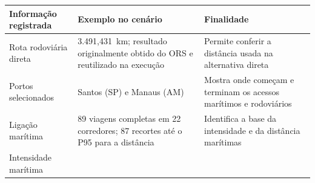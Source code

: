 \documentclass[brazil,]{article}
\begin{document}
\begin{longtable}[]{@{}lll@{}}
\toprule
\begin{minipage}[b]{0.30\columnwidth}\raggedright
Informação registrada\strut
\end{minipage} & \begin{minipage}[b]{0.30\columnwidth}\raggedright
Exemplo no cenário\strut
\end{minipage} & \begin{minipage}[b]{0.30\columnwidth}\raggedright
Finalidade\strut
\end{minipage}\tabularnewline
\midrule
\endhead
\begin{minipage}[t]{0.30\columnwidth}\raggedright
Rota rodoviária direta\strut
\end{minipage} & \begin{minipage}[t]{0.30\columnwidth}\raggedright
3.491,431~km; resultado originalmente obtido do ORS e reutilizado na
execução\strut
\end{minipage} & \begin{minipage}[t]{0.30\columnwidth}\raggedright
Permite conferir a distância usada na alternativa direta\strut
\end{minipage}\tabularnewline
\begin{minipage}[t]{0.30\columnwidth}\raggedright
Portos selecionados\strut
\end{minipage} & \begin{minipage}[t]{0.30\columnwidth}\raggedright
Santos (SP) e Manaus (AM)\strut
\end{minipage} & \begin{minipage}[t]{0.30\columnwidth}\raggedright
Mostra onde começam e terminam os acessos marítimos e rodoviários\strut
\end{minipage}\tabularnewline
\begin{minipage}[t]{0.30\columnwidth}\raggedright
Ligação marítima\strut
\end{minipage} & \begin{minipage}[t]{0.30\columnwidth}\raggedright
89 viagens completas em 22 corredores; 87 recortes até o P95 para a
distância\strut
\end{minipage} & \begin{minipage}[t]{0.30\columnwidth}\raggedright
Identifica a base da intensidade e da distância marítimas\strut
\end{minipage}\tabularnewline
\begin{minipage}[t]{0.30\columnwidth}\raggedright
Intensidade marítima\strut
\end{minipage} & \begin{minipage}[t]{0.30\columnwidth}\raggedright

\end{minipage}
\end{longtable}
\end{document}
